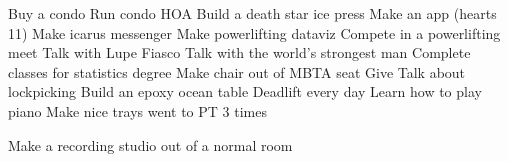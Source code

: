 Buy a condo
Run condo HOA
Build a death star ice press
Make an app (hearts 11)
Make icarus messenger
Make powerlifting dataviz
Compete in a powerlifting meet
Talk with Lupe Fiasco
Talk with the world's strongest man
Complete classes for statistics degree
Make chair out of MBTA seat
Give Talk about lockpicking
Build an epoxy ocean table
Deadlift every day
Learn how to play piano
Make nice trays
went to PT 3 times


Make a recording studio out of a normal room
